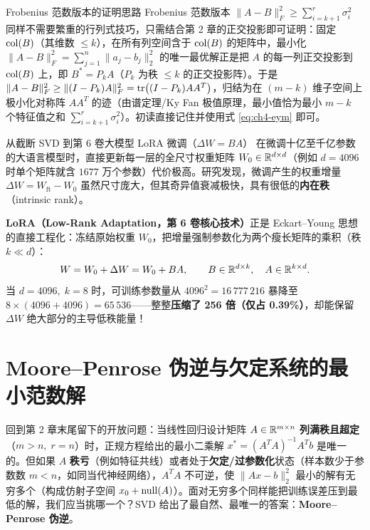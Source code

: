 \begin{extBox}{Frobenius 范数版本的证明思路}
Frobenius 范数版本 $\|A - B\|_F^2 \ge \sum_{i=k+1}^r \sigma_i^2$ 同样不需要繁重的行列式技巧，只需结合第 2 章的正交投影即可证明：固定 $\operatorname{col}(B)$（其维数 $\le k$），在所有列空间含于 $\operatorname{col}(B)$ 的矩阵中，最小化 $\|A - B\|_F^2 = \sum_{j=1}^n \|a_j - b_j\|_2^2$ 的唯一最优解正是把 $A$ 的每一列正交投影到 $\operatorname{col}(B)$ 上，即 $B^* = P_k A$（$P_k$ 为秩 $\le k$ 的正交投影阵）。于是 $\|A - B\|_F^2 \ge \|(I - P_k)A\|_F^2 = \operatorname{tr}\bigl((I - P_k)A A^T\bigr)$，归结为在 $(m-k)$ 维子空间上极小化对称阵 $AA^T$ 的迹（由谱定理/Ky Fan 极值原理，最小值恰为最小 $m-k$ 个特征值之和 $\sum_{i=k+1}^r \sigma_i^2$）。初读直接记住并使用式 \eqref{eq:ch4-eym} 即可。
\end{extBox}

\begin{insightBox}{从截断 SVD 到第 6 卷大模型 LoRA 微调（$\Delta W = B A$）}
在微调十亿至千亿参数的大语言模型时，直接更新每一层的全尺寸权重矩阵 $W_0 \in \mathbb{R}^{d\times d}$（例如 $d = 4096$ 时单个矩阵就含 $1677$ 万个参数）代价极高。研究发现，微调产生的权重增量 $\Delta W = W_{\mathrm{ft}} - W_0$ 虽然尺寸庞大，但其奇异值衰减极快，具有很低的\textbf{内在秩}（intrinsic rank）。

\textbf{LoRA（Low-Rank Adaptation，第 6 卷核心技术）}正是 Eckart--Young 思想的直接工程化：冻结原始权重 $W_0$，把增量强制参数化为两个瘦长矩阵的乘积（秩 $k \ll d$）：
\[
  W = W_0 + \Delta W = W_0 + B A, \qquad B \in \mathbb{R}^{d\times k},\quad A \in \mathbb{R}^{k\times d}.
\]
当 $d = 4096,\; k = 8$ 时，可训练参数量从 $4096^2 = 16\,777\,216$ 暴降至 $8 \times (4096 + 4096) = 65\,536$——整整\textbf{压缩了 256 倍（仅占 0.39\%）}，却能保留 $\Delta W$ 绝大部分的主导低秩能量！
\end{insightBox}

\section{Moore--Penrose 伪逆与欠定系统的最小范数解}
\label{sec:ch4-pinv}

回到第 2 章末尾留下的开放问题：当线性回归设计矩阵 $A \in \mathbb{R}^{m\times n}$ \textbf{列满秩且超定}（$m > n,\; r = n$）时，正规方程给出的最小二乘解 $x^* = (A^T A)^{-1} A^T b$ 是唯一的。但如果 $A$ \textbf{秩亏}（例如特征共线）或者处于\textbf{欠定/过参数化}状态（样本数少于参数数 $m < n$，如同当代神经网络），$A^T A$ 不可逆，使 $\|Ax - b\|_2^2$ 最小的解有无穷多个（构成仿射子空间 $x_0 + \operatorname{null}(A)$）。面对无穷多个同样能把训练误差压到最低的解，我们应当挑哪一个？SVD 给出了最自然、最唯一的答案：\textbf{Moore--Penrose 伪逆}。

